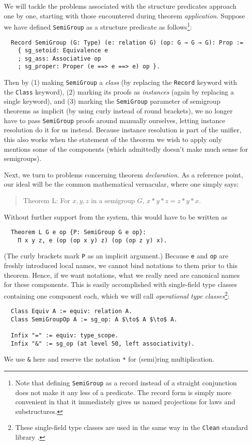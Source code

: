 \documentclass[a4paper,10pt,runningheads]{llncs}
\begin{document}
We will tackle the problems associated with the structure predicates approach one by one, starting with those encountered during theorem \emph{application}. Suppose we have defined \lstinline|SemiGroup| as a structure predicate as follows\footnote{Note that defining \lstinline|SemiGroup| as a record instead of a straight conjunction does not make it any less of a predicate. The record form is simply more convenient in that it immediately gives us named projections for laws and substructures.}:
\begin{lstlisting}
  Record SemiGroup (G: Type) (e: relation G) (op: G → G → G): Prop :=
    { sg_setoid: Equivalence e
    ; sg_ass: Associative op
    ; sg_proper: Proper (e ==> e ==> e) op }.
\end{lstlisting}
Then by (1) making \lstinline|SemiGroup| a \emph{class} (by replacing the \lstinline|Record| keyword with the \lstinline|Class| keyword), (2) marking its proofs as \emph{instances} (again by replacing a single keyword), and (3) marking the \lstinline|SemiGroup| parameter of semigroup theorems as implicit (by using curly instead of round brackets), we no longer have to pass \lstinline|SemiGroup| proofs around manually ourselves, letting instance resolution do it for us instead. Because instance resolution is part of the unifier, this also works when the statement of the theorem we wish to apply only mentions some of the components (which admittedly doesn't make much sense for semigroups).

Next, we turn to problems concerning theorem \emph{declaration}. As a reference point, our ideal will be the common mathematical vernacular, where one simply says:
\begin{quote}
Theorem L: For $x, y, z$ in a semigroup $G$, $x * y * z = z * y * x$.
\end{quote}

Without further support from the system, this would have to be written as
\begin{lstlisting}
  Theorem L G e op {P: SemiGroup G e op}:
    Π x y z, e (op (op x y) z) (op (op z y) x).
\end{lstlisting}
(The curly brackets mark \lstinline|P| as an implicit argument.) Because \lstinline|e| and \lstinline{op} are freshly introduced local names, we cannot bind notations to them prior to this theorem. Hence, if we want notations, what we really need are canonical names for these components. This is easily accomplished with single-field type classes containing one component each, which we will call \emph{operational type classes}\footnote{These single-field type classes are used in the same way in the \lstinline|Clean| standard library \cite{something}.}:
\begin{lstlisting}
  Class Equiv A := equiv: relation A.
  Class SemiGroupOp A := sg_op: A $\to$ A $\to$ A.

  Infix "=" := equiv: type_scope.
  Infix "&" := sg_op (at level 50, left associativity).
\end{lstlisting}
We use \lstinline|&| here and reserve the notation \lstinline|*| for (semi)ring multiplication.
\end{document}
